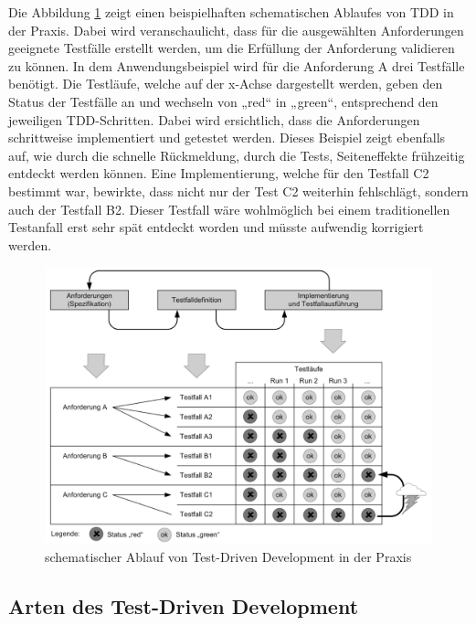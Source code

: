 Die Abbildung \ref{Anwendungsbeispiel TDD} zeigt einen beispielhaften schematischen Ablaufes von TDD in der Praxis. Dabei wird veranschaulicht, dass für die ausgewählten Anforderungen geeignete Testfälle erstellt werden, um die Erfüllung der Anforderung validieren zu können. In dem Anwendungsbeispiel wird für die Anforderung A drei Testfälle benötigt. Die Testläufe, welche auf der x-Achse dargestellt werden, geben den Status der Testfälle an und wechseln von „red“ in „green“, entsprechend den jeweiligen TDD-Schritten. Dabei wird ersichtlich, dass die Anforderungen schrittweise implementiert und getestet werden. Dieses Beispiel zeigt ebenfalls auf, wie durch die schnelle Rückmeldung, durch die Tests, Seiteneffekte frühzeitig entdeckt werden können. Eine Implementierung, welche für den Testfall C2 bestimmt war, bewirkte, dass nicht nur der Test C2 weiterhin fehlschlägt, sondern auch der Testfall B2. Dieser Testfall wäre wohlmöglich bei einem traditionellen Testanfall erst sehr spät entdeckt worden und müsste aufwendig korrigiert werden. \cite[S. 154]{schatten_best_2010}

\begin{figure}[h]
	\centering
	\includegraphics[clip,width=1\linewidth]{images/Anwendungsbeispiel TDD.png}
	\caption[schematischer Ablauf von Test-Driven Development in der Praxis ]{schematischer Ablauf von Test-Driven Development in der Praxis \cite[S. 154]{schatten_best_2010}}
	\label{Anwendungsbeispiel TDD}
\end{figure}

\subsection{Arten des Test-Driven Development}

